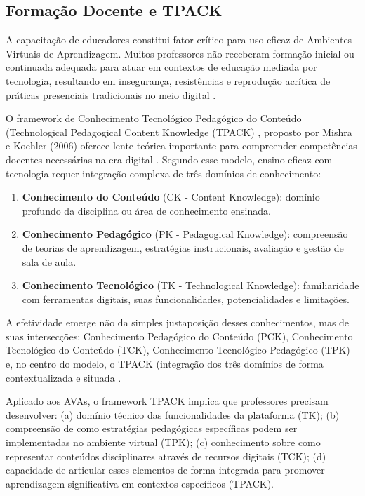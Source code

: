 \documentclass[portuguese]{sbc2025}%
\begin{document}
\subsection{Formação Docente e TPACK}

A capacitação de educadores constitui fator crítico para uso eficaz de Ambientes Virtuais de Aprendizagem. Muitos professores não receberam formação inicial ou continuada adequada para atuar em contextos de educação mediada por tecnologia, resultando em insegurança, resistências e reprodução acrítica de práticas presenciais tradicionais no meio digital \cite{Koehler2009}.

O framework de Conhecimento Tecnológico Pedagógico do Conteúdo (Technological Pedagogical Content Knowledge (TPACK) , proposto por Mishra e Koehler (2006) oferece lente teórica importante para compreender competências docentes necessárias na era digital \cite{Mishra2006}. Segundo esse modelo, ensino eficaz com tecnologia requer integração complexa de três domínios de conhecimento:

\begin{enumerate}
    \item \textbf{Conhecimento do Conteúdo} (CK - Content Knowledge): domínio profundo da disciplina ou área de conhecimento ensinada.
    \item \textbf{Conhecimento Pedagógico} (PK - Pedagogical Knowledge): compreensão de teorias de aprendizagem, estratégias instrucionais, avaliação e gestão de sala de aula.
    \item \textbf{Conhecimento Tecnológico} (TK - Technological Knowledge): familiaridade com ferramentas digitais, suas funcionalidades, potencialidades e limitações.
\end{enumerate}

A efetividade emerge não da simples justaposição desses conhecimentos, mas de suas intersecções: Conhecimento Pedagógico do Conteúdo (PCK), Conhecimento Tecnológico do Conteúdo (TCK), Conhecimento Tecnológico Pedagógico (TPK) e, no centro do modelo, o TPACK (integração dos três domínios de forma contextualizada e situada \cite{Koehler2009}.

Aplicado aos AVAs, o framework TPACK implica que professores precisam desenvolver: (a) domínio técnico das funcionalidades da plataforma (TK); (b) compreensão de como estratégias pedagógicas específicas podem ser implementadas no ambiente virtual (TPK); (c) conhecimento sobre como representar conteúdos disciplinares através de recursos digitais (TCK); (d) capacidade de articular esses elementos de forma integrada para promover aprendizagem significativa em contextos específicos (TPACK).
\end{document}
